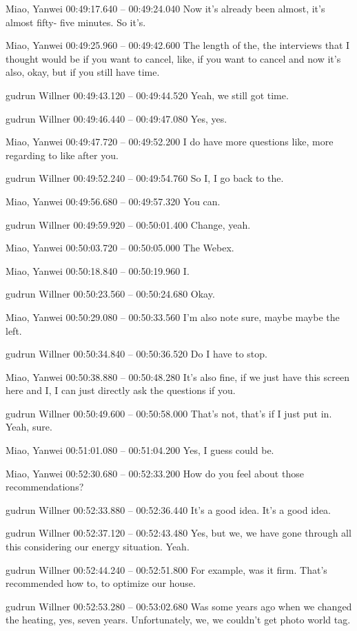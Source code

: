 {Miao, Yanwei 00:49:17.640 -- 00:49:24.040
Now it's already been almost, it's almost fifty- five minutes. So it's.

Miao, Yanwei 00:49:25.960 -- 00:49:42.600
The length of the, the interviews that I thought would be if you want to cancel, like, if you want to cancel and now it's also, okay, but if you still have time.

gudrun Willner 00:49:43.120 -- 00:49:44.520
Yeah, we still got time.

gudrun Willner 00:49:46.440 -- 00:49:47.080
Yes, yes.

Miao, Yanwei 00:49:47.720 -- 00:49:52.200
I do have more questions like, more regarding to like after you.

gudrun Willner 00:49:52.240 -- 00:49:54.760
So I, I go back to the.

Miao, Yanwei 00:49:56.680 -- 00:49:57.320
You can.

gudrun Willner 00:49:59.920 -- 00:50:01.400
Change, yeah.

Miao, Yanwei 00:50:03.720 -- 00:50:05.000
The Webex.

Miao, Yanwei 00:50:18.840 -- 00:50:19.960
I.

gudrun Willner 00:50:23.560 -- 00:50:24.680
Okay.

Miao, Yanwei 00:50:29.080 -- 00:50:33.560
I'm also note sure, maybe maybe the left.

gudrun Willner 00:50:34.840 -- 00:50:36.520
Do I have to stop.

Miao, Yanwei 00:50:38.880 -- 00:50:48.280
It's also fine, if we just have this screen here and I, I can just directly ask the questions if you.

gudrun Willner 00:50:49.600 -- 00:50:58.000
That's not, that's if I just put in. Yeah, sure.

Miao, Yanwei 00:51:01.080 -- 00:51:04.200
Yes, I guess could be.

Miao, Yanwei 00:52:30.680 -- 00:52:33.200
How do you feel about those recommendations?

gudrun Willner 00:52:33.880 -- 00:52:36.440
It's a good idea. It's a good idea.

gudrun Willner 00:52:37.120 -- 00:52:43.480
Yes, but we, we have gone through all this considering our energy situation. Yeah.

gudrun Willner 00:52:44.240 -- 00:52:51.800
For example, was it firm. That's recommended how to, to optimize our house.

gudrun Willner 00:52:53.280 -- 00:53:02.680
Was some years ago when we changed the heating, yes, seven years. Unfortunately, we, we couldn't get photo world tag.

}
